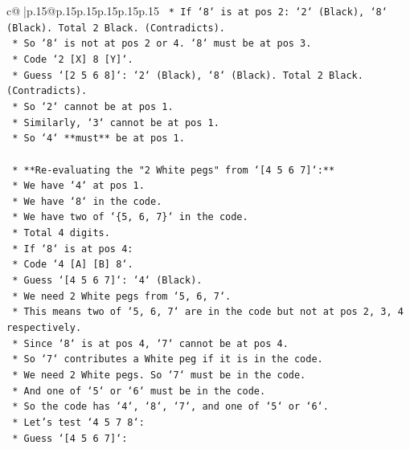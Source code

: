 \documentclass{article}
\begin{document}
{\begin{supertabular}{c@{$\;$}|p{.15\linewidth}@{}p{.15\linewidth}p{.15\linewidth}p{.15\linewidth}p{.15\linewidth}p{.15\linewidth}}
{{{\texttt{            *   If `8` is at pos 2: `2` (Black), `8` (Black). Total 2 Black. (Contradicts).} \\
\texttt{            *   So `8` is not at pos 2 or 4. `8` must be at pos 3.} \\
\texttt{            *   Code `2 {[}X{]} 8 {[}Y{]}`.} \\
\texttt{            *   Guess `{[}2 5 6 8{]}`: `2` (Black), `8` (Black). Total 2 Black. (Contradicts).} \\
\texttt{        *   So `2` cannot be at pos 1.} \\
\texttt{        *   Similarly, `3` cannot be at pos 1.} \\
\texttt{        *   So `4` **must** be at pos 1.} \\
\\ 
\texttt{    *   **Re{-}evaluating the "2 White pegs" from `{[}4 5 6 7{]}`:**} \\
\texttt{        *   We have `4` at pos 1.} \\
\texttt{        *   We have `8` in the code.} \\
\texttt{        *   We have two of `\{5, 6, 7\}` in the code.} \\
\texttt{        *   Total 4 digits.} \\
\texttt{        *   If `8` is at pos 4:} \\
\texttt{            *   Code `4 {[}A{]} {[}B{]} 8`.} \\
\texttt{            *   Guess `{[}4 5 6 7{]}`: `4` (Black).} \\
\texttt{            *   We need 2 White pegs from `5, 6, 7`.} \\
\texttt{            *   This means two of `5, 6, 7` are in the code but not at pos 2, 3, 4 respectively.} \\
\texttt{            *   Since `8` is at pos 4, `7` cannot be at pos 4.} \\
\texttt{            *   So `7` contributes a White peg if it is in the code.} \\
\texttt{            *   We need 2 White pegs. So `7` must be in the code.} \\
\texttt{            *   And one of `5` or `6` must be in the code.} \\
\texttt{            *   So the code has `4`, `8`, `7`, and one of `5` or `6`.} \\
\texttt{            *   Let's test `4 5 7 8`:} \\
\texttt{                *   Guess `{[}4 5 6 7{]}`:} \\
}}}
\end{supertabular}}
\end{document}
